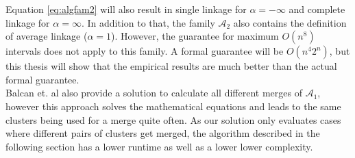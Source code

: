 Equation \ref{eq:algfam2} will also result in single linkage for $\alpha = - \infty$ and complete linkage for $\alpha = \infty$. In addition to that, the family $\mathcal{A}_2$ also contains the definition of average linkage ($\alpha = 1$). However, the guarantee for maximum $O(n^8)$ intervals does not apply to this family. A formal guarantee will be $O(n^4 2^n)$, but this thesis will show that the empirical results are much better than the actual formal guarantee.\\

Balcan et. al also provide a solution to calculate all different merges of $\mathcal{A}_1$, however this approach solves the mathematical equations and leads to the same clusters being used for a merge quite often. As our solution only evaluates cases where different pairs of clusters get merged, the algorithm described in the following section has a lower runtime as well as a lower lower complexity.
